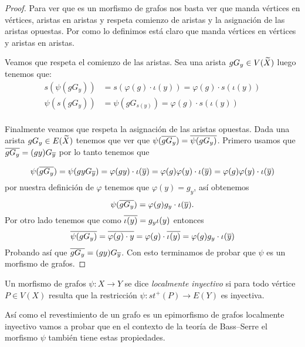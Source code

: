 \documentclass[tesis.tex]{subfiles}
\begin{document}
\begin{proof}
Para ver que es un morfismo de grafos nos basta ver que manda vértices en vértices, aristas en aristas y respeta comienzo de aristas y la asignación de las aristas opuestas.
Por como lo definimos está claro que manda vértices en vértices y aristas en aristas.

Veamos que respeta el comienzo de las aristas.
Sea una arista $gG_y \in V(\widetilde X)$ luego tenemos que:
\begin{align*}
s(\psi(gG_y  )) &= s (\varphi(g) \cdot \iota(y)) =  \varphi(g) \cdot  s(\iota(y)) 	\\ 
\psi(s(gG_y ))  &= \psi(gG_{s(y)} ) = \varphi(g) \cdot {s(\iota(y))} \\
\end{align*}	

Finalmente veamos que respeta la asignación de las aristas opuestas.	
Dada una arista $g G_y \in E(\widetilde X)$ tenemos que ver que $\psi(\overline{g G_y }) = \overline{\psi(g G_y )}$.	
Primero usamos que $\overline{g G_y } = (gy)G_{\overline y}$ por lo tanto tenemos que 

\[
	\psi(\overline{gG_y  }) = \psi(gyG_{\overline y}) = \varphi(gy) \cdot \iota(\overline y)  = \varphi(g)\varphi(y) \cdot \iota(\overline y) = \varphi(g)\varphi(y) \cdot \iota(\overline y)      	
\]
por nuestra definición de $\varphi$ tenemos que $\varphi(y) = g_{y}$, así obtenemos
\[
	\psi(\overline{gG_y  }) =  \varphi(g) g_y \cdot \iota(\overline y). 
\]
Por otro lado tenemos que como $\overline{\iota(y)} = g_{y}\iota(y)$ entonces
\[
	\overline{\psi(gG_y )} = \overline{ \varphi(g) \cdot  y } = \varphi(g) \cdot  \overline{\iota( y)} = \varphi(g)g_{y} \cdot \iota(\overline y) 
\]
Probando así que $ \overline{g G_y } = (gy)G_{\overline y} $.
Con esto terminamos de probar que $\psi$ es un morfismo de grafos.

\end{proof}


\begin{deff}
	Un morfismo de grafos $\psi:X \to Y$ se dice \emph{localmente inyectivo} si para todo vértice $P \in V(X)$ resulta que la restricción $\psi: st^{+}(P) \to E(Y)$ es inyectiva. 
\end{deff}

Así como el revestimiento de un grafo es un epimorfismo de grafos localmente inyectivo vamos a probar que en el contexto de la teoría de Bass--Serre el morfismo $\psi$ también tiene estas propiedades.
\end{document}
